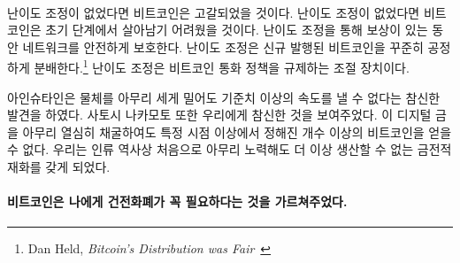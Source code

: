 \paragraph{}
\begin{comment}	
	If it weren't for this difficulty adjustment, all bitcoins would have been mined
	already. If it weren't for this difficulty adjustment, Bitcoin probably wouldn't
	have survived in its infancy. It is what secures the network in its reward era.
	It is what ensures a steady and fair distribution\footnote{Dan Held,
		\textit{Bitcoin's Distribution was Fair}~\cite{distribution-was-fair}} of new
	bitcoin. It is the thermostat which regulates Bitcoin's monetary policy.
\end{comment}
난이도 조정이 없었다면 비트코인은 고갈되었을 것이다. 
난이도 조정이 없었다면 비트코인은 초기 단계에서 살아남기 어려웠을 것이다.
난이도 조정을 통해 보상이 있는 동안 네트워크를 안전하게 보호한다. 
난이도 조정은 신규 발행된 비트코인을 꾸준히 공정하게 분배한다.\footnote{Dan Held,
	\textit{Bitcoin’s Distribution was Fair}~\cite{distribution-was-fair}}
난이도 조정은 비트코인 통화 정책을 규제하는 조절 장치이다.

\begin{comment}	
	Einstein showed us something novel: no matter how hard you push an
	object, at a certain point you won't be able to get more speed out of
	it. Satoshi also showed us something novel: no matter how hard you dig
	for this digital gold, at a certain point you won't be able to get more
	bitcoin out of it. For the first time in human history, we have a
	monetary good which, no matter how hard you try, you won't be able to
	produce more of.
\end{comment}
아인슈타인은 물체를 아무리 세게 밀어도 기준치 이상의 속도를 낼 수 없다는 참신한 발견을 하였다.
사토시 나카모토 또한 우리에게 참신한 것을 보여주었다. 
이 디지털 금을 아무리 열심히 채굴하여도 특정 시점 이상에서 정해진 개수 이상의 비트코인을 얻을 수 없다. 
우리는 인류 역사상 처음으로 아무리 노력해도 더 이상 생산할 수 없는 금전적 재화를 갖게 되었다.

\paragraph{비트코인은 나에게 건전화폐가 꼭 필요하다는 것을 가르쳐주었다.}

